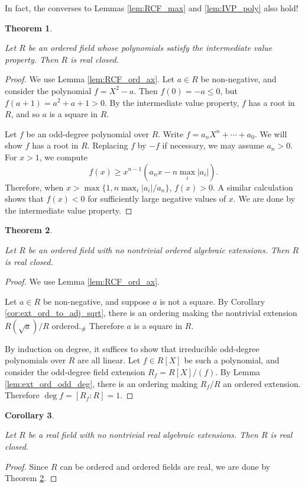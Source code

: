 \documentclass{article}
\newtheorem{theorem}{Theorem}[section]
\newtheorem{corollary}[theorem]{Corollary}
\newcommand{\leanok}{}
\newcommand{\lean}[1]{}
\newcommand{\uses}[1]{}
\begin{document}
In fact, the converses to Lemmas \ref{lem:RCF_max} and \ref{lem:IVP_poly} also hold!

\begin{theorem}
  \label{thm:IVP_poly_imp_RCF}
  \uses{def:RCF}
  \lean{IsRealClosed.of_ivp}
  \leanok
  Let $R$ be an ordered field whose polynomials satisfy the intermediate value property. Then $R$ is real closed.
\end{theorem}
\begin{proof}
  \uses{lem:RCF_ord_ax}
  \leanok
  We use Lemma \ref{lem:RCF_ord_ax}. Let $a\in R$ be non-negative, and consider the polynomial $f=X^2-a$. Then $f(0)=-a\leq0$, but $f(a+1)=a^2+a+1>0$. By the intermediate value property, $f$ has a root in $R$, and so $a$ is a square in $R$.

  Let $f$ be an odd-degree polynomial over $R$. Write $f=a_nX^n+\cdots+a_0$. We will show $f$ has a root in $R$. Replacing $f$ by $-f$ if necessary, we may assume $a_n>0$. For $x>1$, we compute
  \[f(x)\geq x^{n-1}(a_nx-n\max_i|a_i|).\]
  Therefore, when $x>\max\{1,n\max_i|a_i|/a_n\}$, $f(x)>0$. A similar calculation shows that $f(x)<0$ for sufficiently large negative values of $x$. We are done by the intermediate value property.
\end{proof}

\begin{theorem}
  \label{thm:ord_max_imp_RCF}
  \uses{def:RCF}
  \lean{IsRealClosed.of_bijective_algebraMap_of_isOrderedAlgebra}
  Let $R$ be an ordered field with no nontrivial ordered algebraic extensions. Then $R$ is real closed.
\end{theorem}
\begin{proof}
  \uses{lem:RCF_ord_ax,cor:ext_ord_to_adj_sqrt,lem:ext_ord_odd_deg}
  We use Lemma \ref{lem:RCF_ord_ax}.

  Let $a\in R$ be non-negative, and suppose $a$ is not a square. By Corollary \ref{cor:ext_ord_to_adj_sqrt}, there is an ordering making the nontrivial extension $R(\sqrt{a})/R$ ordered.$_\#$ Therefore $a$ is a square in $R$.

  By induction on degree, it suffices to show that irreducible odd-degree polynomials over $R$ are all linear. Let $f\in R[X]$ be such a polynomial, and consider the odd-degree field extension $R_f=R[X]/(f)$. By Lemma \ref{lem:ext_ord_odd_deg}, there is an ordering making $R_f/R$ an ordered extension. Therefore $\deg f=[R_f:R]=1$.
\end{proof}

\begin{corollary}
  \label{cor:real_max_imp_RCF}
  \uses{def:RCF}
  \lean{IsRealClosed.of_bijective_algebraMap_of_isSemireal}
  \leanok
  Let $R$ be a real field with no nontrivial real algebraic extensions. Then $R$ is real closed.
\end{corollary}
\begin{proof}
  \uses{thm:ord_iff_real,thm:ord_max_imp_RCF}
  \leanok
  Since $R$ can be ordered and ordered fields are real, we are done by Theorem \ref{thm:ord_max_imp_RCF}.
\end{proof}
\end{document}
